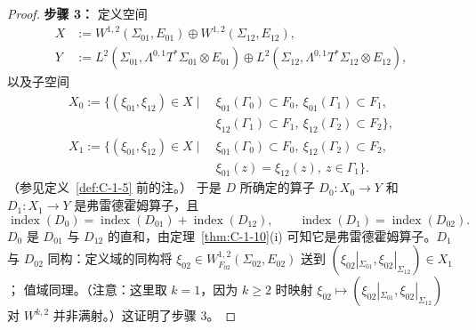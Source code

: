 \begin{proof}
\noindent\textbf{步骤 3：} 定义空间
\begin{align*}
  X&:=W^{1,2}(\Sigma_{01},E_{01})\oplus
      W^{1,2}(\Sigma_{12},E_{12}),\\
  Y&:=L^2(\Sigma_{01},\Lambda^{0,1}T^*\Sigma_{01}\otimes E_{01})
      \oplus L^2(\Sigma_{12},\Lambda^{0,1}T^*\Sigma_{12}\otimes E_{12}),
\end{align*}
以及子空间
\begin{align*}
  X_0:=\{(\xi_{01},\xi_{12})\in X\mid&
     \ \xi_{01}(\Gamma_0)\subset F_0,
       \ \xi_{01}(\Gamma_1)\subset F_1,\\
    &\ \xi_{12}(\Gamma_1)\subset F_1,
       \ \xi_{12}(\Gamma_2)\subset F_2\},\\
  X_1:=\{(\xi_{01},\xi_{12})\in X\mid&
     \ \xi_{01}(\Gamma_0)\subset F_0,
       \ \xi_{12}(\Gamma_2)\subset F_2,\\
    &\ \xi_{01}(z)=\xi_{12}(z),\ z\in\Gamma_1\}.
\end{align*}
（参见定义~\ref{def:C-1-5} 前的注。）
于是 $D$ 所确定的算子 $D_0:X_0\to Y$ 和 $D_1:X_1\to Y$
是弗雷德霍姆算子，且
\[
  \operatorname{index}(D_0)
    =\operatorname{index}(D_{01})+\operatorname{index}(D_{12}),\qquad
  \operatorname{index}(D_1)=\operatorname{index}(D_{02}).
\]
$D_0$ 是 $D_{01}$ 与 $D_{12}$ 的直和，由定理~\ref{thm:C-1-10}(i)
可知它是弗雷德霍姆算子。$D_1$ 与 $D_{02}$ 同构：定义域的同构将
$\xi_{02}\in W_{F_{02}}^{1,2}(\Sigma_{02},E_{02})$
送到 $(\xi_{02}|_{\Sigma_{01}},\xi_{02}|_{\Sigma_{12}})\in X_1$；
值域同理。（注意：这里取 $k=1$，因为 $k\ge2$ 时映射
$\xi_{02}\mapsto(\xi_{02}|_{\Sigma_{01}},\xi_{02}|_{\Sigma_{12}})$
对 $W^{k,2}$ 并非满射。）这证明了步骤 3。


\end{proof}

